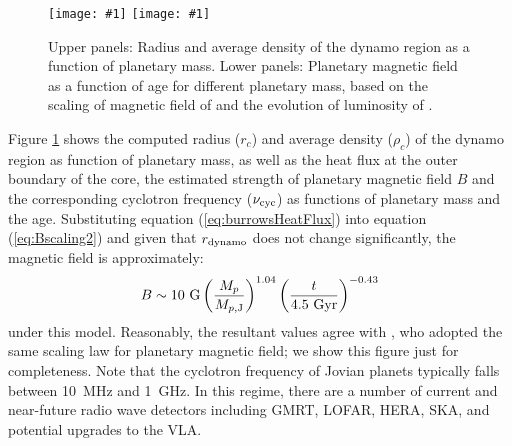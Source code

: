 \documentclass[iop,numberedappendix,apj]{emulateapj}
\def\plotoneh#1{\centering \leavevmode
\texttt{[image: \#1]}}
\begin{document}
\begin{figure}[bhtp]
   \plotoneh{rho_r_dynamo.pdf}
   \plotoneh{qBf_Christensen.pdf}
   \caption{Upper panels: Radius and average density of the dynamo region as a function of planetary mass. Lower panels: Planetary magnetic field as a function of age for different planetary mass, based on the scaling of magnetic field of \citet{christensen2010} and the evolution of luminosity of \citet{burrows_et_al2001}.} 
  \label{fig:planetaryB}
\end{figure}

Figure \ref{fig:planetaryB} shows the computed radius ($r_c$) and average density ($\rho_c$) of the dynamo region as function of planetary mass, as well as the heat flux at the outer boundary of the core, the estimated strength of planetary magnetic field $B$ and the corresponding cyclotron frequency ($\nu_{\rm cyc}$) as functions of planetary mass and the age. 
Substituting equation (\ref{eq:burrowsHeatFlux}) into equation (\ref{eq:Bscaling2}) and given that $r_{\rm dynamo} $ does not change significantly, the magnetic field is approximately:
\begin{equation}
B   \sim   10~{\rm G} \left( \frac{M_p }{M_{p,{\rm J}}} \right)^{1.04} \left( \frac{t}{4.5~\rm{Gyr}} \right)^{-0.43} \label{eq:scalingB}
\end{equation}
under this model. 
Reasonably, the resultant values agree with \citet{reiners2010}, who adopted the same scaling law for planetary magnetic field; we show this figure just for completeness. 
Note that the cyclotron frequency of Jovian planets typically falls between 10~MHz and 1~GHz. 
In this regime, there are a number of current and near-future radio wave detectors including GMRT, 
LOFAR, HERA, SKA, and potential upgrades to the VLA. 
\end{document}

